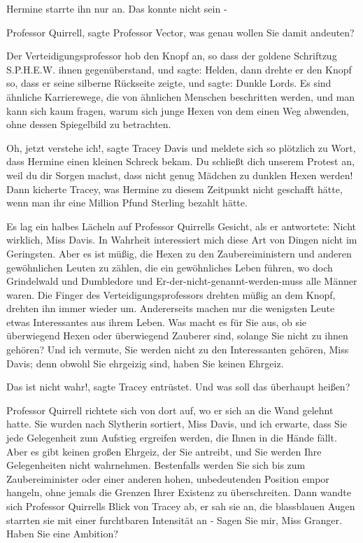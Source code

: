 Hermine starrte ihn nur an. Das konnte nicht sein -

\glqq{}Professor Quirrell\grqq{}, sagte Professor Vector, \glqq{}was genau wollen
Sie damit andeuten?\grqq{}

Der Verteidigungsprofessor hob den Knopf an, so dass der goldene Schriftzug
S.P.H.E.W. ihnen gegenüberstand, und sagte: \glqq{}Helden\grqq{}, dann drehte er
den Knopf so, dass er seine silberne Rückseite zeigte, und sagte: \glqq{}Dunkle
Lords. Es sind ähnliche Karrierewege, die von ähnlichen Menschen beschritten
werden, und man kann sich kaum fragen, warum sich junge Hexen von dem einen Weg
abwenden, ohne dessen Spiegelbild zu betrachten.\grqq{}

\glqq{}Oh, jetzt verstehe ich!\grqq{}, sagte Tracey Davis und meldete sich so
plötzlich zu Wort, dass Hermine einen kleinen Schreck bekam. \glqq{}Du schließt
dich unserem Protest an, weil du dir Sorgen machst, dass nicht genug Mädchen zu
dunklen Hexen werden!\grqq{} Dann kicherte Tracey, was Hermine zu diesem
Zeitpunkt nicht geschafft hätte, wenn man ihr eine Million Pfund Sterling
bezahlt hätte.

Es lag ein halbes Lächeln auf Professor Quirrells Gesicht, als er antwortete:
\glqq{}Nicht wirklich, Miss Davis. In Wahrheit interessiert mich diese Art von
Dingen nicht im Geringsten. Aber es ist müßig, die Hexen zu den
Zaubereiministern und anderen gewöhnlichen Leuten zu zählen, die ein
gewöhnliches Leben führen, wo doch Grindelwald und Dumbledore und
Er-der-nicht-genannt-werden-muss alle Männer waren.\grqq{} Die Finger des
Verteidigungsprofessors drehten müßig an dem Knopf, drehten ihn immer wieder um.
\glqq{}Andererseits machen nur die wenigsten Leute etwas Interessantes aus ihrem
Leben. Was macht es für Sie aus, ob sie überwiegend Hexen oder überwiegend
Zauberer sind, solange Sie nicht zu ihnen gehören? Und ich vermute, Sie werden
nicht zu den Interessanten gehören, Miss Davis; denn obwohl Sie ehrgeizig sind,
haben Sie keinen Ehrgeiz.\grqq{}

\glqq{}Das ist nicht wahr!\grqq{}, sagte Tracey entrüstet. \glqq{}Und was soll das
überhaupt heißen?\grqq{}

Professor Quirrell richtete sich von dort auf, wo er sich an die Wand gelehnt
hatte. \glqq{}Sie wurden nach Slytherin sortiert, Miss Davis, und ich erwarte,
dass Sie jede Gelegenheit zum Aufstieg ergreifen werden, die Ihnen in die Hände
fällt. Aber es gibt keinen großen Ehrgeiz, der Sie antreibt, und Sie werden Ihre
Gelegenheiten nicht wahrnehmen. Bestenfalls werden Sie sich bis zum
Zaubereiminister oder einer anderen hohen, unbedeutenden Position empor hangeln,
ohne jemals die Grenzen Ihrer Existenz zu überschreiten.\grqq{} Dann wandte sich
Professor Quirrells Blick von Tracey ab, er sah sie an, die blassblauen Augen
starrten sie mit einer furchtbaren Intensität an - \glqq{}Sagen Sie mir, Miss
Granger. Haben Sie eine Ambition?\grqq{}

